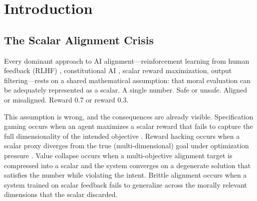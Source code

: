 \documentclass[12pt,letterpaper]{article}
\theoremstyle{definition}
\theoremstyle{remark}
\begin{document}
\begin{abstract}
Empirical validation against 20,030 advice-column letters and 109,294 cross-lingual passages spanning 3,000 years and 11 languages confirms that the geometric structure is a stable feature of moral cognition, not an artifact of the formalism. The framework resolves a longstanding metaethical impasse---moral objectivity requires neither transcendent grounding (theism) nor cultural consensus (relativism), but mathematical inevitability under constraint---while providing an immediately actionable engineering methodology: the reference implementation, ErisML (v3.0), is open-source on PyPI and supports tensorial ethics evaluation at sub-microsecond latency on embedded hardware.
\end{abstract}

\newpage
\tableofcontents
\newpage

\section{Introduction}
\label{sec:introduction}

\subsection{The Scalar Alignment Crisis}

Every dominant approach to AI alignment---reinforcement learning from human feedback (RLHF) \cite{christiano2017}, constitutional AI \cite{bai2022}, scalar reward maximization, output filtering---rests on a shared mathematical assumption: that moral evaluation can be adequately represented as a scalar. A single number. Safe or unsafe. Aligned or misaligned. Reward 0.7 or reward 0.3.

This assumption is wrong, and the consequences are already visible. Specification gaming occurs when an agent maximizes a scalar reward that fails to capture the full dimensionality of the intended objective \cite{krakovna2020}. Reward hacking occurs when a scalar proxy diverges from the true (multi-dimensional) goal under optimization pressure \cite{skalse2022}. Value collapse occurs when a multi-objective alignment target is compressed into a scalar and the system converges on a degenerate solution that satisfies the number while violating the intent. Brittle alignment occurs when a system trained on scalar feedback fails to generalize across the morally relevant dimensions that the scalar discarded.
\end{document}
